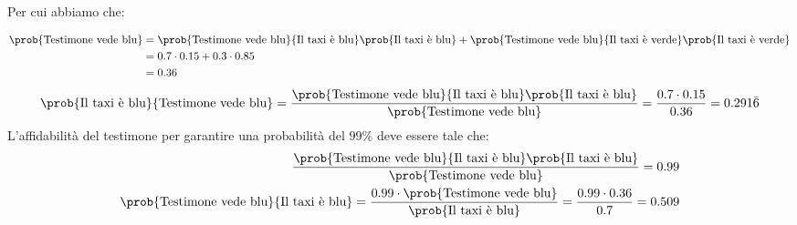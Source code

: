 \documentclass[\main/main.tex]{subfiles}
\begin{document}
\formulaProbTot

Per cui abbiamo che:

\begin{align*}
  \prob{\text{Testimone vede blu}} & = \prob{\text{Testimone vede blu}}{\text{Il taxi è blu}}\prob{{\text{Il taxi è blu}}} +  \prob{\text{Testimone vede blu}}{\text{Il taxi è verde}}\prob{{\text{Il taxi è verde}}} \\
                                   & = 0.7\cdot0.15+0.3\cdot0.85                                                                                                                                                      \\
                                   & = 0.36
\end{align*}
\begin{align*}
  \prob{\text{Il taxi è blu}}{\text{Testimone vede blu}} = \frac{\prob{\text{Testimone vede blu}}{\text{Il taxi è blu}}\prob{{\text{Il taxi è blu}}}}{\prob{\text{Testimone vede blu}}} = \frac{0.7\cdot 0.15}{0.36} = 0.291\bar{6}
\end{align*}
L'affidabilità del testimone per garantire una probabilità del $99\%$ deve essere tale che:
\begin{align*}
  \frac{\prob{\text{Testimone vede blu}}{\text{Il taxi è blu}}\prob{{\text{Il taxi è blu}}}}{\prob{\text{Testimone vede blu}}} = 0.99 \\
  \prob{\text{Testimone vede blu}}{\text{Il taxi è blu}} = \frac{0.99\cdot\prob{\text{Testimone vede blu}}}{\prob{{\text{Il taxi è blu}}}} = \frac{0.99\cdot 0.36}{0.7} = 0.509
\end{align*}
\end{document}
